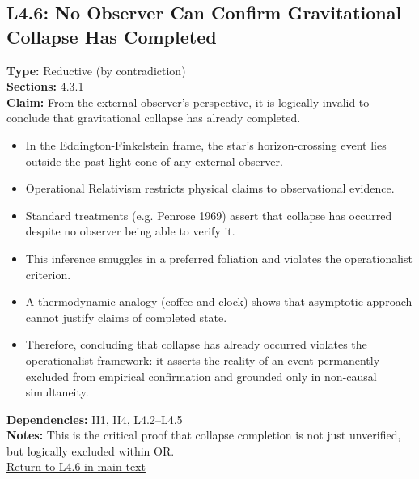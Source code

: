 \documentclass[12pt]{book}
\newcommand{\returnlink}[1]{\hyperref[logic:#1]{Return to #1 in main text}\xspace}
\begin{document}
\subsection*{L4.6: No Observer Can Confirm Gravitational Collapse Has Completed}\label{appendix:L4.6}
\textbf{Type:} Reductive (by contradiction) \\
\textbf{Sections:} 4.3.1 \\
\textbf{Claim:} From the external observer's perspective, it is logically invalid to conclude that gravitational collapse has already completed.
\begin{itemize}
  \item In the Eddington-Finkelstein frame, the star's horizon-crossing event lies outside the past light cone of any external observer.
  \item Operational Relativism restricts physical claims to observational evidence.
  \item Standard treatments (e.g. Penrose 1969) assert that collapse has occurred despite no observer being able to verify it.
  \item This inference smuggles in a preferred foliation and violates the operationalist criterion.
  \item A thermodynamic analogy (coffee and clock) shows that asymptotic approach cannot justify claims of completed state.
  \item Therefore, concluding that collapse has already occurred violates the operationalist framework: it asserts the reality of an event permanently excluded from empirical confirmation and grounded only in non-causal simultaneity.
\end{itemize}
\textbf{Dependencies:} II1, II4, L4.2–L4.5 \\
\textbf{Notes:} This is the critical proof that collapse completion is not just unverified, but logically excluded within OR.\\
\returnlink{L4.6}
\end{document}
